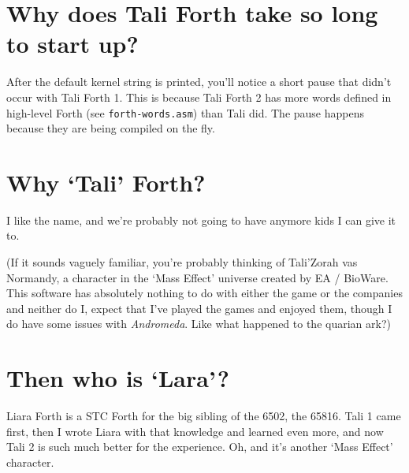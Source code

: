\section{Why does Tali Forth take so long to start up?}

After the default kernel string is printed, you'll notice a short pause that
didn't occur with Tali Forth 1. This is because Tali Forth 2 has more words
defined in high-level Forth (see \texttt{forth-words.asm}) than Tali did. The
pause happens because they are being compiled on the fly.

\section{Why `Tali' Forth?}

I like the name, and we're probably not going to have anymore kids I can give it
to.

(If it sounds vaguely familiar, you're probably thinking of Tali'Zorah vas
Normandy, a character in the `Mass Effect' universe created by EA / BioWare.
This software has absolutely nothing to do with either the game or the companies
and neither do I, expect that I've played the games and enjoyed them, though I
do have some issues with \emph{Andromeda}. Like what happened to the quarian ark?)

\section{Then who is `Lara'?}

Liara Forth is a STC Forth for the big sibling of the 6502, the 65816. Tali 1
came first, then I wrote Liara with that knowledge and learned even more, and
now Tali 2 is such much better for the experience. Oh, and it's another `Mass
Effect' character.

